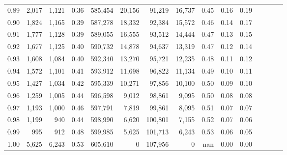 \begin{tabular}{rrrcrrrrrrrrrrr}
0.89 &   2,017 &  1,121 &                                       0.36 &  585,454 &   20,156 &   91,219 &   16,737 &  0.45 &  0.16 &                         0.19 \\
0.90 &   1,824 &  1,165 &                                       0.39 &  587,278 &   18,332 &   92,384 &   15,572 &  0.46 &  0.14 &                         0.17 \\
0.91 &   1,777 &  1,128 &                                       0.39 &  589,055 &   16,555 &   93,512 &   14,444 &  0.47 &  0.13 &                         0.15 \\
0.92 &   1,677 &  1,125 &                                       0.40 &  590,732 &   14,878 &   94,637 &   13,319 &  0.47 &  0.12 &                         0.14 \\
0.93 &   1,608 &  1,084 &                                       0.40 &  592,340 &   13,270 &   95,721 &   12,235 &  0.48 &  0.11 &                         0.12 \\
0.94 &   1,572 &  1,101 &                                       0.41 &  593,912 &   11,698 &   96,822 &   11,134 &  0.49 &  0.10 &                         0.11 \\
0.95 &   1,427 &  1,034 &                                       0.42 &  595,339 &   10,271 &   97,856 &   10,100 &  0.50 &  0.09 &                         0.10 \\
0.96 &   1,259 &  1,005 &                                       0.44 &  596,598 &    9,012 &   98,861 &    9,095 &  0.50 &  0.08 &                         0.08 \\
0.97 &   1,193 &  1,000 &                                       0.46 &  597,791 &    7,819 &   99,861 &    8,095 &  0.51 &  0.07 &                         0.07 \\
0.98 &   1,199 &    940 &                                       0.44 &  598,990 &    6,620 &  100,801 &    7,155 &  0.52 &  0.07 &                         0.06 \\
0.99 &     995 &    912 &                                       0.48 &  599,985 &    5,625 &  101,713 &    6,243 &  0.53 &  0.06 &                         0.05 \\
1.00 &   5,625 &  6,243 &                                       0.53 &  605,610 &        0 &  107,956 &        0 &   nan &  0.00 &                         0.00 \\
\bottomrule
\end{tabular}
